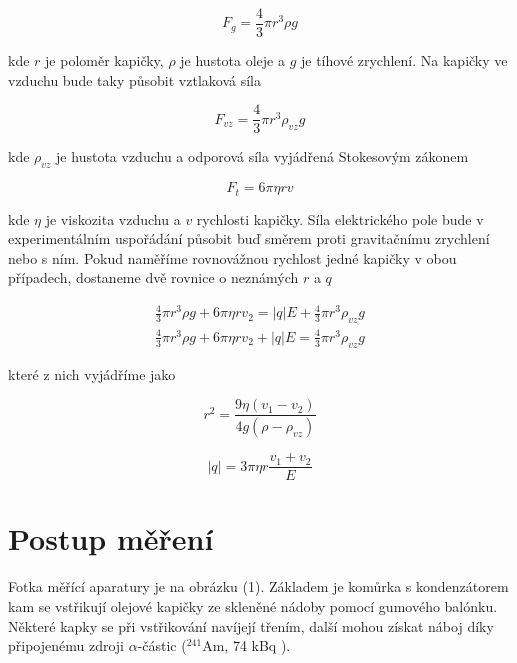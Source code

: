 \documentclass[a4paper,11pt]{article}
\begin{document}
\begin{equation}
F_g = \frac{4}{3} \pi r^{3} \rho g
\end{equation}

\noindent
kde $ r $ je poloměr kapičky, $ \rho $ je hustota oleje a $ g $ je tíhové zrychlení. Na kapičky ve vzduchu bude taky působit vztlaková síla

\begin{equation}
F_{vz} =  \frac{4}{3} \pi r^{3} \rho_{vz} g
\end{equation}

\noindent
kde $ \rho_{vz} $ je hustota vzduchu a odporová síla vyjádřená Stokesovým zákonem

\begin{equation}
 F_t = 6 \pi \eta r v
\end{equation}

\noindent
kde $ \eta $ je viskozita vzduchu a $ v $ rychlosti kapičky. Síla elektrického pole bude v experimentálním uspořádání působit buď směrem proti gravitačnímu zrychlení nebo s ním. Pokud naměříme rovnovážnou rychlost jedné kapičky v obou případech, dostaneme dvě rovnice o neznámých $ r $ a $ q $ 

\begin{align*}
    \frac{4}{3} \pi r^{3} \rho g + 6 \pi \eta r v_2 = | q |  E + \frac{4}{3} \pi r^{3} \rho_{vz} g \\
    \frac{4}{3} \pi r^{3} \rho g + 6 \pi \eta r v_2  + | q |  E = \frac{4}{3} \pi r^{3} \rho_{vz} g
\end{align*}

\noindent
které z nich vyjádříme jako

\begin{equation}
r^2 = \frac{9 \eta (v_1 - v_2) }{4 g (\rho - \rho_{vz})}
\end{equation}

\begin{equation}
|q| = 3 \pi \eta r \frac{v_1 + v_2}{E}
\end{equation}

\section{Postup měření}

Fotka měřící aparatury je na obrázku (1). Základem je komůrka s kondenzátorem kam se  vstřikují olejové kapičky ze skleněné nádoby pomocí gumového balónku. Některé kapky se při vstřikování navíjejí třením, další mohou získat náboj díky připojenému zdroji $ \alpha $-částic  ($ ^{241} $Am, 74 kBq ).
\end{document}

